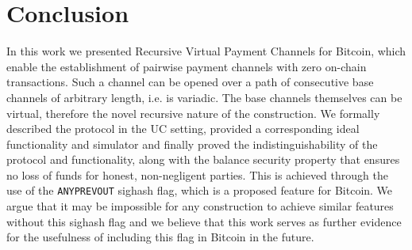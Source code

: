 \section{Conclusion}
  In this work we presented Recursive Virtual Payment Channels for Bitcoin,
  which enable the establishment of pairwise payment channels with zero on-chain
  transactions. Such a channel can be opened over a path of consecutive base
  channels of arbitrary length, i.e. is variadic. The base channels themselves
  can be virtual, therefore the novel recursive nature of the construction. We
  formally described the protocol in the UC setting, provided a corresponding
  ideal functionality and simulator and finally proved the indistinguishability
  of the protocol and functionality, along with the balance security property
  that ensures no loss of funds for honest, non-negligent parties. This is
  achieved through the use of the \texttt{ANYPREVOUT} sighash flag, which is a
  proposed feature for Bitcoin. We argue that it may be impossible for any
  construction to achieve similar features without this sighash flag and we
  believe that this work serves as further evidence for the usefulness of
  including this flag in Bitcoin in the future.
